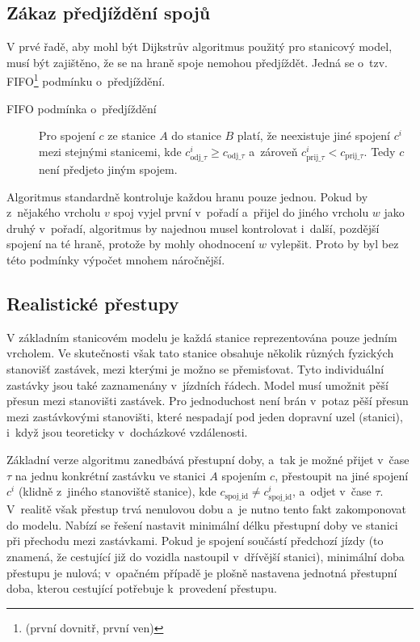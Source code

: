 \subsection{Zákaz předjíždění spojů}
V prvé řadě, aby mohl být Dijkstrův algoritmus použitý pro stanicový model, musí být zajištěno, že se na hraně spoje nemohou předjíždět. Jedná se o~tzv. FIFO\footnote{ (první dovnitř, první ven)} podmínku o~předjíždění.

\begin{description}
	\item[FIFO podmínka o~předjíždění] Pro spojení \(c\) ze stanice \(A\) do stanice \(B\) platí, že neexistuje jiné spojení \(c^{i}\) mezi stejnými stanicemi, kde \(c^{i}_{\text{odj\_}\tau} \geq c_{\text{odj\_}\tau}\) a~zároveň \(c^{i}_{\text{prij\_}\tau} < c_{\text{prij\_}\tau}\). Tedy \(c\) není předjeto jiným spojem.
\end{description}

Algoritmus standardně kontroluje každou hranu pouze jednou. Pokud by z~nějakého vrcholu \(v\) spoj vyjel první v~pořadí a~přijel do jiného vrcholu \(w\) jako druhý v~pořadí, algoritmus by najednou musel kontrolovat i~další, pozdější spojení na té hraně, protože by mohly ohodnocení \(w\) vylepšit. Proto by byl bez této podmínky výpočet mnohem náročnější.

\subsection{Realistické přestupy}
\label{prestupyTD}
V základním stanicovém modelu je každá stanice reprezentována pouze jedním vrcholem. Ve skutečnosti však tato stanice obsahuje několik různých fyzických stanovišť zastávek, mezi kterými je možno se přemisťovat. Tyto individuální zastávky jsou také zaznamenány v~jízdních řádech. Model musí umožnit pěší přesun mezi stanovišti zastávek. Pro jednoduchost není brán v~potaz pěší přesun mezi zastávkovými stanovišti, které nespadají pod jeden dopravní uzel (stanici), i~když jsou teoreticky v~docházkové vzdálenosti.

Základní verze algoritmu zanedbává přestupní doby, a~tak je možné přijet v~čase \(\tau\) na jednu konkrétní zastávku ve stanici \(A\) spojením \(c\), přestoupit na jiné spojení \(c^i\) (klidně z~jiného stanoviště stanice), kde \(c_{\text{spoj\_id}} \neq c^i_{\text{spoj\_id}}\), a~odjet v~čase \(\tau\). V~realitě však přestup trvá nenulovou dobu a~je nutno tento fakt zakomponovat do modelu. Nabízí se řešení nastavit minimální délku přestupní doby ve stanici při přechodu mezi zastávkami. Pokud je spojení součástí předchozí jízdy (to znamená, že cestující již do vozidla nastoupil v~dřívější stanici), minimální doba přestupu je nulová; v~opačném případě je plošně nastavena jednotná přestupní doba, kterou cestující potřebuje k~provedení přestupu. 

